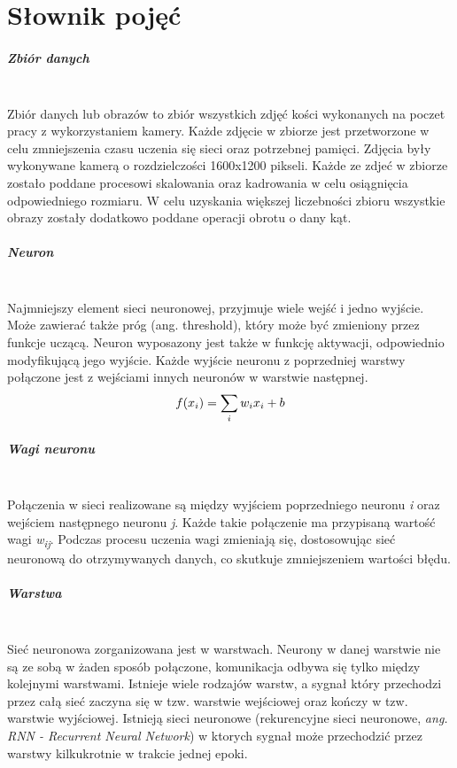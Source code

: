
\chapter{Słownik pojęć}

\paragraph{Zbiór danych} \mbox{}\\
Zbiór danych lub obrazów to zbiór wszystkich zdjęć kości wykonanych na poczet
pracy z wykorzystaniem kamery. Każde zdjęcie w zbiorze jest przetworzone w celu
zmniejszenia czasu uczenia się sieci oraz potrzebnej pamięci. Zdjęcia były wykonywane
kamerą o rozdzielczości 1600x1200 pikseli. Każde ze zdjeć w zbiorze zostało
poddane procesowi skalowania oraz kadrowania w celu osiągnięcia odpowiedniego
rozmiaru. W celu uzyskania większej liczebności zbioru wszystkie obrazy zostały
dodatkowo poddane operacji obrotu o dany kąt.

\paragraph{Neuron} \mbox{}\\
Najmniejszy element sieci neuronowej, przyjmuje wiele wejść i jedno wyjście. Może
zawierać także próg (ang. threshold), który może być zmieniony przez funkcje uczącą.
Neuron wyposazony jest także w funkcję aktywacji, odpowiednio modyfikującą jego wyjście.
Każde wyjście neuronu z poprzedniej warstwy połączone jest z wejściami innych neuronów
w warstwie następnej.
\begin{equation}
f(x_{i}) = \sum_{i}w_{i}x_{i} + b \\
\end{equation}

\paragraph{Wagi neuronu} \mbox{}\\
Połączenia w sieci realizowane są między wyjściem poprzedniego neuronu \textit{i}
oraz wejściem następnego neuronu \textit{j}. Każde takie połączenie ma przypisaną
wartość wagi \textit{w\textsubscript{ij}}. Podczas procesu uczenia wagi zmieniają
się, dostosowując sieć neuronową do otrzymywanych danych, co skutkuje
zmniejszeniem wartości błędu.

\paragraph{Warstwa} \mbox{}\\
Sieć neuronowa zorganizowana jest w warstwach. Neurony w danej warstwie nie są
ze sobą w żaden sposób połączone, komunikacja odbywa się tylko między kolejnymi
warstwami. Istnieje wiele rodzajów warstw, a sygnał który przechodzi przez całą
sieć zaczyna się w tzw. warstwie wejściowej oraz kończy w tzw. warstwie wyjściowej.
Istnieją sieci neuronowe (rekurencyjne sieci neuronowe, \textit{ang. RNN - Recurrent Neural Network})
w ktorych sygnał może przechodzić przez warstwy kilkukrotnie w trakcie jednej epoki.

